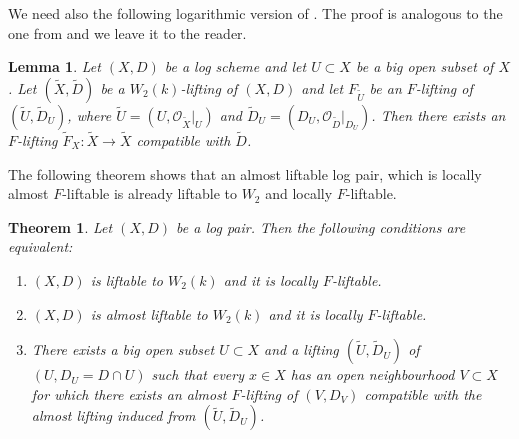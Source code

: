 \documentclass[12pt]{article}
\theoremstyle{plain}
\newtheorem{Theorem}[Thm]{\sc Theorem}
\newtheorem{Lemma}[Thm]{\sc Lemma}
\theoremstyle{definition}
\theoremstyle{remark}
\newcommand{\cO}{{\mathcal O}}
\begin{document}
\medskip

We need also the following logarithmic version of  \cite[Theorem 3.3.6 (a), (iii)]{AWZ}. The proof is analogous to the one from \cite{AWZ} and we leave it to the reader.

\begin{Lemma}\label{AWZ-lemma}
Let $(X,D)$ be a log scheme and let $U\subset X$ be a big open subset of $X$. Let $(\tilde X,\tilde D)$ be a $W_2(k)$-lifting of $(X,D)$ and let $F_{\tilde U}$ be an $F$-lifting of  $(\tilde U,\tilde D_U)$, where $\tilde U=(U, \cO_{\tilde X}|_U)$ and $\tilde D_U=(D_U, \cO_{\tilde D}|_{D_U})$. Then there exists 
an  $F$-lifting $\tilde F_X: \tilde X\to \tilde X$ compatible with $\tilde D$.
\end{Lemma}

The following theorem shows that an almost liftable log pair, which is locally almost $F$-liftable is already liftable to $W_2$ and locally $F$-liftable.

\begin{Theorem}\label{equivalences-for-almost-liftings}
Let $(X,D)$ be a log pair. Then the following conditions are equivalent:
\begin{enumerate}
	\item $(X,D)$ is liftable to $W_2(k)$ and it is locally $F$-liftable.	
	\item $(X,D)$ is almost liftable to $W_2(k)$ and it is locally $F$-liftable.
	\item There exists a big open subset $U\subset X$  and a lifting  $(\tilde U, \tilde D_U)$ of $(U, D_U=D\cap U)$ such that every $x\in X$ has an open neighbourhood $V\subset X$ for which there exists an almost $F$-lifting of $(V, D_V)$ compatible with the almost lifting  induced from $(\tilde U, \tilde D_U)$. 
\end{enumerate}
\end{Theorem}
\end{document}
